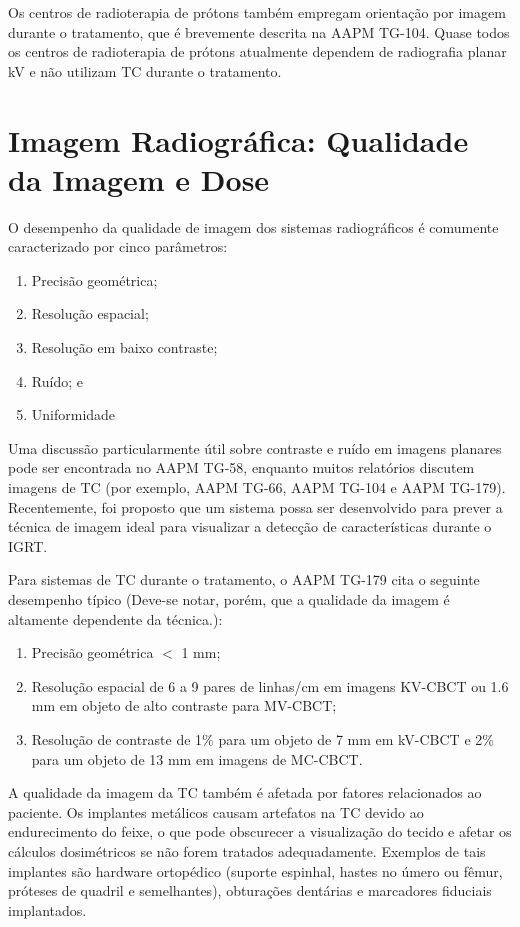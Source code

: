 \documentclass[11pt,a4paper]{article}
\newcounter{exemplo}
\begin{document}
    Os centros de radioterapia de prótons também empregam orientação por imagem durante o tratamento, que é brevemente descrita na AAPM TG-104. Quase todos os centros de radioterapia de prótons atualmente dependem de radiografia planar kV e não utilizam TC durante o tratamento. 
    

\section{Imagem Radiográfica: Qualidade da Imagem e Dose}

    O desempenho da qualidade de imagem dos sistemas radiográficos é comumente caracterizado por cinco parâmetros:

    \begin{enumerate}
        \item Precisão geométrica;
        \item Resolução espacial;
        \item Resolução em baixo contraste;
        \item Ruído; e
        \item Uniformidade
    \end{enumerate}

    Uma discussão particularmente útil sobre contraste e ruído em imagens planares pode ser encontrada no AAPM TG-58, enquanto muitos relatórios discutem imagens de TC (por exemplo, AAPM TG-66, AAPM TG-104 e AAPM TG-179). Recentemente, foi proposto que um sistema possa ser desenvolvido para prever a técnica de imagem ideal para visualizar a detecção de características durante o IGRT.

    Para sistemas de TC durante o tratamento, o AAPM TG-179 cita o seguinte desempenho típico (Deve-se notar, porém, que a qualidade da imagem é altamente dependente da técnica.):

    \begin{enumerate}[label=\textcolor{CarnationPink}{\roman*.}]
        \item Precisão geométrica $<$ 1 mm;
        \item Resolução espacial de 6 a 9 pares de linhas/cm em imagens KV-CBCT ou 1.6 mm em objeto de alto contraste para MV-CBCT;
        \item Resolução de contraste de 1\% para um objeto de 7 mm em kV-CBCT e 2\% para um objeto de 13 mm em imagens de MC-CBCT.
    \end{enumerate}

    A qualidade da imagem da TC também é afetada por fatores relacionados ao paciente. Os implantes metálicos causam artefatos na TC devido ao endurecimento do feixe, o que pode obscurecer a visualização do tecido e afetar os cálculos dosimétricos se não forem tratados adequadamente. Exemplos de tais implantes são hardware ortopédico (suporte espinhal, hastes no úmero ou fêmur, próteses de quadril e semelhantes), obturações dentárias e marcadores fiduciais implantados.
\end{document}
